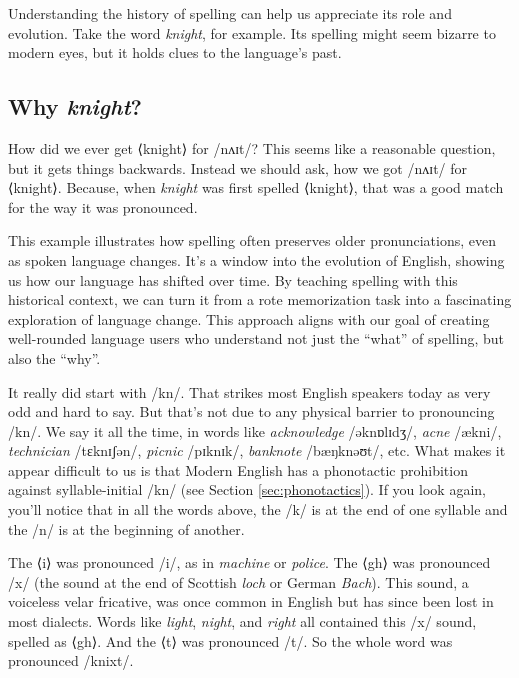 Understanding the history of spelling can help us appreciate its role and evolution. Take the word \textit{knight}, for example. Its spelling might seem bizarre to modern eyes, but it holds clues to the language's past.

\subsection{Why \textit{knight}?}

How did we ever get ⟨knight⟩ for /nʌɪt/? This seems like a reasonable question, but it gets things backwards. Instead we should ask, how we got /nʌɪt/ for ⟨knight⟩. Because, when \textit{knight} was first spelled ⟨knight⟩, that was a good match for the way it was pronounced.

This example illustrates how spelling often preserves older pronunciations, even as spoken language changes. It's a window into the evolution of English, showing us how our language has shifted over time. By teaching spelling with this historical context, we can turn it from a rote memorization task into a fascinating exploration of language change. This approach aligns with our goal of creating well-rounded language users who understand not just the ``what'' of spelling, but also the ``why''.

It really did start with /kn/. That strikes most English speakers today as very odd and hard to say. But that's not due to any physical barrier to pronouncing /kn/. We say it all the time, in words like \textit{acknowledge} /əknɒlɪdʒ/, \textit{acne} /ækni/, \textit{technician} /tɛknɪʃən/, \textit{picnic} /pɪknɪk/, \textit{banknote} /bæŋknəʊt/, etc. What makes it appear difficult to us is that Modern English has a phonotactic prohibition against syllable-initial /kn/ (see Section \ref{sec:phonotactics}). If you look again, you'll notice that in all the words above, the /k/ is at the end of one syllable and the /n/ is at the beginning of another.

The ⟨i⟩ was pronounced /i/, as in \textit{machine} or \textit{police}. The ⟨gh⟩ was pronounced /x/ (the sound at the end of Scottish \textit{loch} or German \textit{Bach}). This sound, a voiceless velar fricative, was once common in English but has since been lost in most dialects. Words like \textit{light}, \textit{night}, and \textit{right} all contained this /x/ sound, spelled as ⟨gh⟩. And the ⟨t⟩ was pronounced /t/. So the whole word was pronounced /knixt/.

